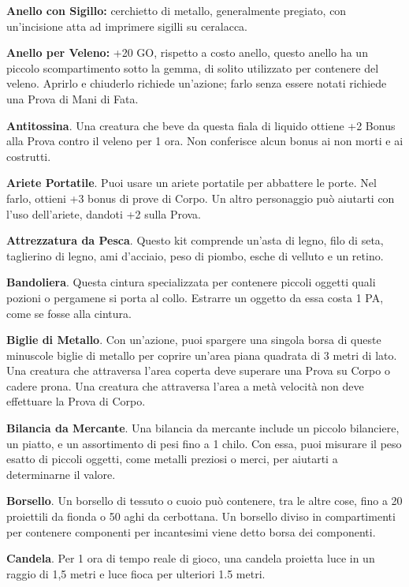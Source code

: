 \documentclass[12pt,a4paper,twoside,openany]{book}
\begin{document}
\begin{multicols}{2}
\textbf{Anello con Sigillo:} cerchietto di metallo, generalmente pregiato, con un'incisione atta ad imprimere sigilli su ceralacca.

\textbf{Anello per Veleno:} +20 GO, rispetto a costo anello, questo anello ha un piccolo scompartimento sotto la gemma, di solito utilizzato per contenere del veleno. Aprirlo e chiuderlo richiede un'azione; farlo senza essere notati richiede una Prova di Mani di Fata.

\textbf{Antitossina}. Una creatura che beve da questa fiala di liquido ottiene +2 Bonus alla Prova contro il veleno per 1 ora. Non conferisce alcun bonus ai non morti e ai costrutti.

\textbf{Ariete Portatile}. Puoi usare un ariete portatile per abbattere le porte. Nel farlo, ottieni +3 bonus di prove di Corpo. Un altro personaggio può aiutarti con l’uso dell’ariete, dandoti +2 sulla Prova.

\textbf{Attrezzatura da Pesca}. Questo kit comprende un’asta di legno, filo di seta, taglierino di legno, ami d’acciaio, peso di piombo, esche di velluto e un retino.

\textbf{Bandoliera}. Questa cintura specializzata per contenere piccoli oggetti quali pozioni o pergamene si porta al collo. Estrarre un oggetto da essa costa 1 PA, come se fosse alla cintura.

\textbf{Biglie di Metallo}. Con un’azione, puoi spargere una singola borsa di queste minuscole biglie di metallo per coprire un’area piana quadrata di 3 metri di lato. Una creatura che attraversa l’area coperta deve superare una Prova su Corpo o cadere prona. Una creatura che attraversa l’area a metà velocità non deve effettuare la Prova di Corpo.

\textbf{Bilancia da Mercante}. Una bilancia da mercante include un piccolo bilanciere, un piatto, e un assortimento di pesi fino a 1 chilo. Con essa, puoi misurare il peso esatto di piccoli oggetti, come metalli preziosi o merci, per aiutarti a determinarne il valore.

\textbf{Borsello}. Un borsello di tessuto o cuoio può contenere, tra le altre cose, fino a 20 proiettili da fionda o 50 aghi da cerbottana. Un borsello diviso in compartimenti per contenere componenti per incantesimi viene detto borsa dei componenti.

\textbf{Candela}. Per 1 ora di tempo reale di gioco, una candela proietta luce in un raggio di 1,5 metri e luce fioca per ulteriori 1.5 metri.


\end{multicols}
\end{document}
